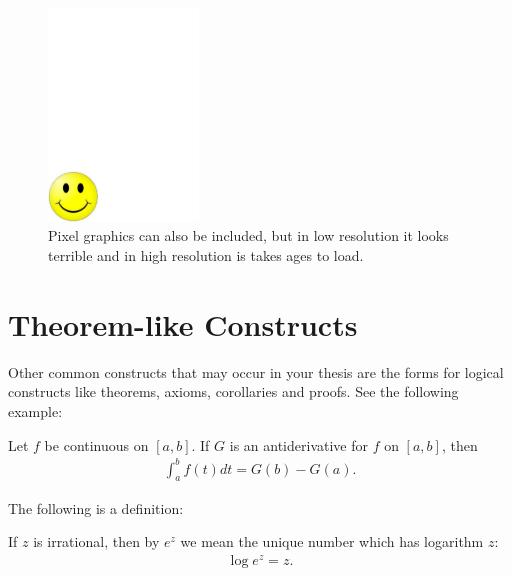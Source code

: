 \documentclass[a4paper,11pt,\myPageLayout]{book}
\begin{document}


\begin{figure}[t]
\centering
\includegraphics[width=4cm]{figures/Smiley.pdf}
\vspace*{-0cm}
\caption{Pixel graphics can also be included, but in low resolution it looks terrible and in high resolution is takes ages to load.}
\label{figure:smiley}
\end{figure}



\section{Theorem-like Constructs}
\label{section:constructs}
Other common constructs that may occur in your thesis are
the forms for logical constructs like theorems, axioms,
corollaries and proofs. See the following example:

\begin{Theorem}
Let $f$ be continuous on $[a,b]$.  If $G$ is
an antiderivative for $f$ on $[a,b]$, then
\begin{align}
  \int^{b}_{a}f(t)dt = G(b) - G(a).
\end{align}
\end{Theorem}

The following is a definition:
\begin{Definition}
If $z$ is irrational, then by $e^z$ we mean the
unique number which has logarithm $z$:
\begin{align}
  \log e^z = z.
\end{align}
\end{Definition}
\end{document}
